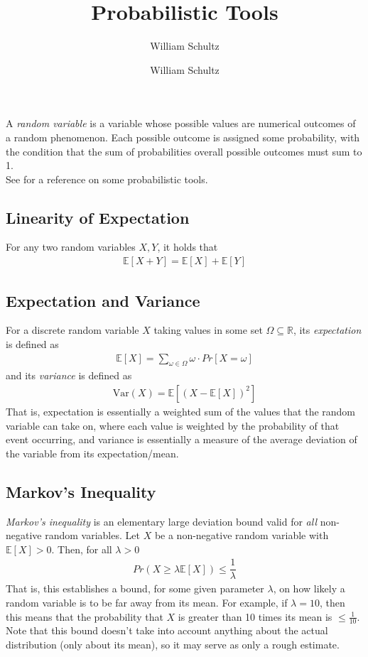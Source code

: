 \documentclass[10pt,a4paper]{article}
\author{William Schultz}
\begin{document}
\title{Probabilistic Tools}
\author{William Schultz}
\maketitle

\newcommand{\expect}[1]{\mathbb{E}\left[#1\right]}
\newcommand{\var}[1]{\text{Var}(#1)}

A \textit{random variable} is a variable whose possible values are numerical outcomes of a random phenomenon. Each possible outcome is assigned some probability, with the condition that the sum of probabilities overall possible outcomes must sum to 1.\\See \cite{Doerr_2019} for a reference on some probabilistic tools.

\subsection*{Linearity of Expectation}
For any two random variables $X,Y$, it holds that
\begin{align*}
    \mathbb{E}[X + Y] =  \mathbb{E}[X] + \mathbb{E}[Y]
\end{align*}

\subsection*{Expectation and Variance}

For a discrete random variable $X$ taking values in some set $\Omega \subseteq \mathbb{R}$, its \textit{expectation} is defined as
\begin{align*}
    \expect{X} = \sum_{\omega \in \Omega} \omega \cdot Pr\left[X=\omega\right]
\end{align*}
and its \textit{variance} is defined as 
\begin{align*}
    \var{X} = \expect{(X - \expect{X})^2}
\end{align*}
That is, expectation is essentially a weighted sum of the values that the random variable can take on, where each value is weighted by the probability of that event occurring, and variance is essentially a measure of the average deviation of the variable from its expectation/mean.

\subsection*{Markov's Inequality}

\textit{Markov's inequality} is an elementary large deviation bound valid for \textit{all} non-negative random variables. Let $X$ be a non-negative random variable with $\expect{X} > 0$. Then, for all $\lambda > 0$
\begin{align*}
    Pr(X \geq \lambda \expect{X}) \leq \dfrac{1}{\lambda}
\end{align*}
That is, this establishes a bound, for some given parameter $\lambda$, on how likely a random variable is to be far away from its mean. For example, if $\lambda = 10$, then this means that the probability that $X$ is greater than 10 times its mean is $\leq \frac{1}{10}$. Note that this bound doesn't take into account anything about the actual distribution (only about its mean), so it may serve as only a rough estimate.
\end{document}
